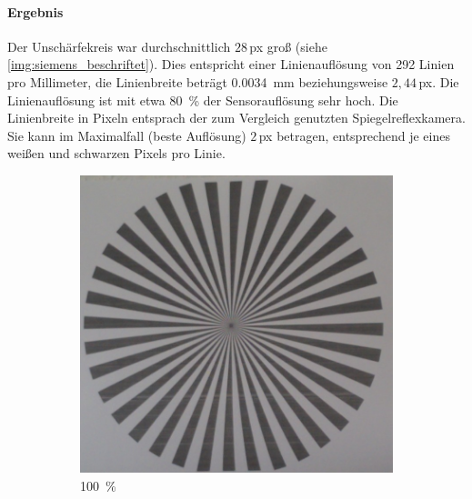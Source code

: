 \documentclass[./00PhotoBox.tex]{subfiles}
\begin{document}
\paragraph{Ergebnis}

Der Unschärfekreis war durchschnittlich $28$\,\gls{px} groß (siehe \autoref{img:siemens_beschriftet}). Dies entspricht einer Linienauflösung von 292 Linien pro Millimeter, die Linienbreite beträgt \SI{0,0034}{\milli\metre} beziehungsweise $2,44$\,\gls{px}. Die Linienauflösung ist mit etwa \SI{80}{\percent} der Sensorauflösung sehr hoch. Die Linienbreite in Pixeln entsprach der zum Vergleich genutzten Spiegelreflexkamera. Sie kann im Maximalfall (beste Auflösung) $2$\,\gls{px} betragen, entsprechend je eines weißen und schwarzen Pixels pro Linie.


\begin{figure}
    \centering
    \begin{subfigure}{0.45\textwidth}
        \includegraphics[height=0.9\linewidth]{./img/4_voruntersuchung/siemens.jpg}
        \centering
        \caption{\SI{100}{\percent}}
        \label{img:siemens}
    \end{subfigure}
    \begin{subfigure}{0.45\textwidth}

\end{subfigure}
\end{figure}
\end{document}
